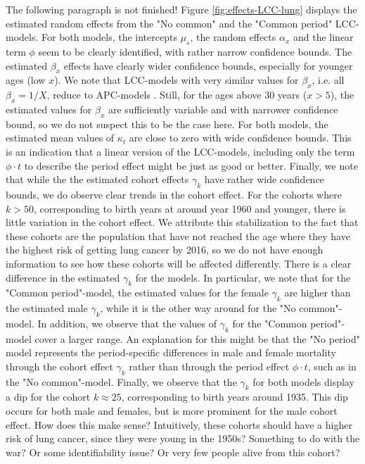\textcolor{myDarkBlue}{The following paragraph is not finished! }
\newpar Figure \ref{fig:effects-LCC-lung} displays the estimated random effects from the "No common" and the "Common period" LCC-models. For both models, the intercepts $\mu_s$, the random effects $\alpha_x$ and the linear term $\phi$ seem to be clearly identified, with rather narrow confidence bounds. The estimated $\beta_x$ effects have clearly wider confidence bounds, especially for younger ages (low $x$). We note that LCC-models with very similar values for $\beta_x$, i.e. all $\beta_x = 1/X$, reduce to APC-models \parencite{Wisniowski2015}. Still, for the ages above 30 years ($x > 5$), the estimated values for $\beta_x$ are sufficiently variable and with narrower confidence bound, so we do not suspect this to be the case here. For both models, the estimated mean values of $\kappa_t$ are close to zero with wide confidence bounds. This is an indication that a linear version of the LCC-models, including only the term $\phi \cdot t$ to describe the period effect might be just as good or better. Finally, we note that while the the estimated cohort effects $\gamma_k$ have rather wide confidence bounds, we do observe clear trends in the cohort effect. For the cohorts where $k > 50$, corresponding to birth years at around year 1960 and younger, there is little variation in the cohort effect. We attribute this stabilization to the fact that these cohorts are the population that have not reached the age where they have the highest risk of getting lung cancer by 2016, so we do not have enough information to see how these cohorts will be affected differently. There is a clear difference in the estimated $\gamma_k$ for the models. In particular, we note that for the "Common period"-model, the estimated values for the female $\gamma_k$ are higher than the estimated male $\gamma_k$, while it is the other way around for the "No common"-model. In addition, we observe that the values of $\gamma_k$ for the "Common period"-model cover a larger range. An explanation for this might be that the "No period" model represents the period-specific differences in male and female mortality through the cohort effect $\gamma_k$ rather than through the period effect $\phi \cdot t$, such as in the "No common"-model. Finally, we observe that the $\gamma_k$ for both models display a dip for the cohort $k \approx 25$, corresponding to birth years around 1935. This dip occurs for both male and females, but is more prominent for the male cohort effect. \textcolor{myDarkGreen}{How does this make sense? Intuitively, these cohorts should have a higher risk of lung cancer, since they were young in the 1950s? Something to do with the war? Or some identifiability issue? Or very few people alive from this cohort? }

